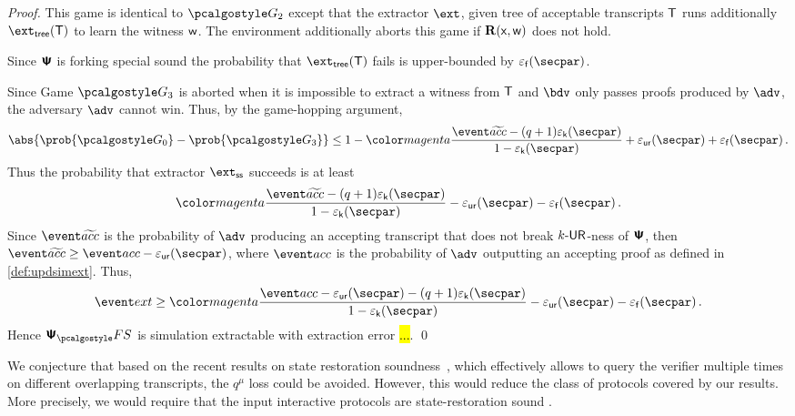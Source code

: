 \begin{proof}
 This game is identical to $\game{2}$ except that the extractor $\ext$,
given tree of acceptable transcripts $\mathsf{T}$ runs additionally $\extt (\tree)$ to
learn the witness $\mathsf{w}$. The environment additionally aborts this game if
$\mathbf{R}(\mathsf{x}, \mathsf{w})$ does not hold.
	
		Since $\bm{\mathsf{\Psi}}$ is forking special sound the probability that $\extt(\tree)$
		fails is upper-bounded by $\epsss(\secpar)$.
		
     Since Game $\game{3}$ is aborted when it is impossible to
    extract a witness from $\mathsf{T}$ and $\bdv$ only passes proofs produced by $\adv$,
    the adversary $\advse$ cannot win. Thus, by the game-hopping argument,
		\[
      \abs{\prob{\game{0}} - \prob{\game{3}}} \leq 1 - \changedm{\frac{\waccProb - (q
          + 1) \epsk(\secpar)}{1 - \epsk(\secpar)}} + \epsur(\secpar) +
		\epsss(\secpar)\,.
		\]
		Thus the probability that extractor $\extss$ succeeds is at least
		\[
      \changedm{\frac{\waccProb - (q + 1) \epsk(\secpar)}{1 - \epsk(\secpar)}} -
      \epsur(\secpar)
		- \epsss(\secpar)\,.
		\]
		Since $\waccProb$ is the probability of $\advse$ producing an accepting transcript
		that does not break ${k\text{-}\mathsf{UR}}$-ness of $\bm{\mathsf{\Psi}}$, then $\waccProb \geq \accProb -
		\epsur(\secpar)$, where $\accProb$ is the probability of $\advse$ outputting an accepting
		proof as defined in \cref{def:updsimext}. Thus, 
		\begin{equation}
      \label{eq:frk}
      \extProb \geq \changedm{\frac{\accProb - \epsur(\secpar) - (q + 1) \epsk(\secpar)}{1 - \epsk(\secpar)}} 
      - \epsur(\secpar) - \epsss(\secpar)\,.
		\end{equation}
		Hence $\psfs$ is simulation extractable with extraction error \hl{...}. 
	\qed
\end{proof}


We conjecture that based on the recent results on state restoration
soundness~\cite{C:GhoTes21}, which effectively allows to query the verifier multiple
times on different overlapping transcripts, the $q^{\mu}$ loss could be
avoided. However, this would reduce the class of protocols covered by our
results. More precisely, we would require that the input interactive protocols are
state-restoration sound \cite{TCC:BenChiSpo16}.

